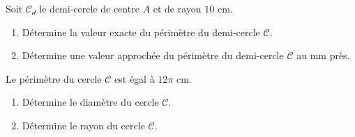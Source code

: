 \begin{pageAD}

Soit $\mathcal{C_d}$ le demi-cercle de centre $A$ et de rayon $10$ cm.
\begin{enumerate}
\item Détermine la valeur exacte du périmètre du demi-cercle $\mathcal{C}$. 
\item Détermine une valeur approchée du périmètre du demi-cercle $\mathcal{C}$ au mm près. 
 \end{enumerate}  

 

Le périmètre du cercle $\mathcal{C}$ est égal à $12\pi$ cm.
 \begin{enumerate}
\item Détermine le diamètre du cercle $\mathcal{C}$. 
\item Détermine le rayon du cercle $\mathcal{C}$.
 \end{enumerate}  

 
\end{pageAD}
  

